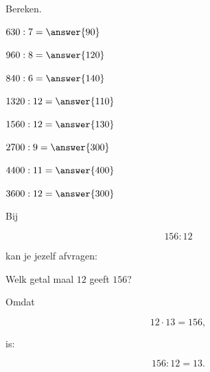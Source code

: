 \documentclass{ximera}
\begin{document}
\begin{oefening}{\oefB}

Bereken.

\begin{question} \(630:7=\answer{90}\) \end{question}

\begin{question} \(960:8=\answer{120}\) \end{question}

\begin{question} \(840:6=\answer{140}\) \end{question}

\begin{question} \(1320:12=\answer{110}\) \end{question}

\begin{question} \(1560:12=\answer{130}\) \end{question}

\begin{question} \(2700:9=\answer{300}\) \end{question}

\begin{question} \(4400:11=\answer{400}\) \end{question}

\begin{question} \(3600:12=\answer{300}\) \end{question}

\end{oefening}




Bij

\[
156:12
\]

kan je jezelf afvragen:

\begin{center}
Welk getal maal \(12\) geeft \(156\)?
\end{center}

Omdat

\[
12\cdot13=156,
\]

is:

\[
156:12=13.
\]
\end{document}
